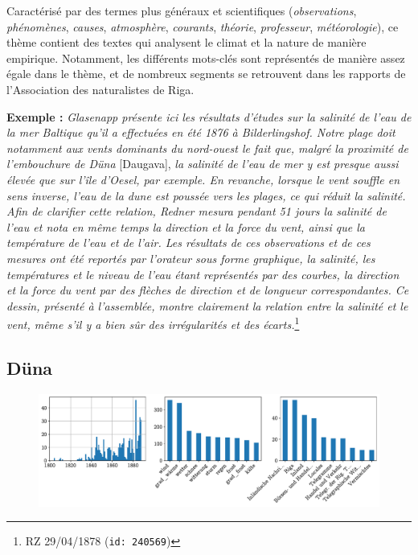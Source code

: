 \documentclass[a4paper,twoside,12pt]{article}
\begin{document}
\noindent Caractérisé par des termes plus généraux et scientifiques (\textit{observations}, \textit{phénomènes}, \textit{causes}, \textit{atmosphère}, \textit{courants}, \textit{théorie}, \textit{professeur}, \textit{météorologie}), ce thème contient des textes qui analysent le climat et la nature de manière empirique. Notamment, les différents mots-clés sont représentés de manière assez égale dans le thème, et de nombreux segments se retrouvent dans les rapports de l'Association des naturalistes de Riga.

\medskip

\noindent \textbf{Exemple :} \textit{Glasenapp présente ici les résultats d'études sur la salinité de l'eau de la mer Baltique qu'il a effectuées en été 1876 à Bilderlingshof. Notre plage doit notamment aux vents dominants du nord-ouest le fait que, malgré la proximité de l'embouchure de Düna} [Daugava], \textit{la salinité de l'eau de mer y est presque aussi élevée que sur l'île d'Oesel, par exemple. En revanche, lorsque le vent souffle en sens inverse, l'eau de la dune est poussée vers les plages, ce qui réduit la salinité. Afin de clarifier cette relation, Redner mesura pendant 51 jours la salinité de l'eau et nota en même temps la direction et la force du vent, ainsi que la température de l'eau et de l'air. Les résultats de ces observations et de ces mesures ont été reportés par l'orateur sous forme graphique, la salinité, les températures et le niveau de l'eau étant représentés par des courbes, la direction et la force du vent par des flèches de direction et de longueur correspondantes.
Ce dessin, présenté à l'assemblée, montre clairement la relation entre la salinité et le vent, même s'il y a bien sûr des irrégularités et des écarts.}\footnote{RZ 29/04/1878 (\texttt{id: 240569})}

\clearpage


\subsection{Düna} \label{topic14_düna}

\begin{figure}[H]
\centering
\includegraphics[width=\textwidth]{images/topic_charts_14.pdf}
\end{figure}
\end{document}
